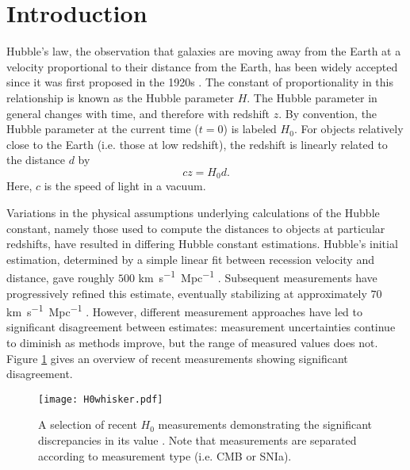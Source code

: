 \section{\label{sec:intro} Introduction}

Hubble's law, the observation that galaxies are moving away from the Earth at a velocity proportional to their distance from the Earth, has been widely accepted since it was first proposed in the 1920s \cite{Hubble_1929}.
The constant of proportionality in this relationship is known as the Hubble parameter $H$.
The Hubble parameter in general changes with time, and therefore with redshift $z$. By convention, the Hubble parameter at the current time ($t=0$) is labeled $H_0$.
For objects relatively close to the Earth (i.e. those at low redshift), the redshift is linearly related to the distance $d$ by \cite{Freedman_2010}
\begin{equation}
    c z = H_0 d.
\end{equation}
Here, $c$ is the speed of light in a vacuum.

Variations in the physical assumptions underlying calculations of the Hubble constant, namely those used to compute the distances to objects at particular redshifts, have resulted in differing Hubble constant estimations.
Hubble’s initial estimation, determined by a simple linear fit between recession velocity and distance, gave roughly $500$ \si{km.s^{-1}.Mpc^{-1}} \cite{Hubble_1929}.
Subsequent measurements have progressively refined this estimate, eventually stabilizing at approximately $70$ \si{km.s^{-1}.Mpc^{-1}} \cite{Freedman_2010}.
However, different measurement approaches have led to significant disagreement between estimates: measurement uncertainties continue to diminish as methods improve, but the range of measured values does not.
Figure \ref{fig:hist_h0} gives an overview of recent measurements showing significant disagreement.

\begin{figure}
    \centering
    \texttt{[image: H0whisker.pdf]}
    \caption{A selection of recent $H_0$ measurements demonstrating the significant discrepancies in its value \cite{Pogosian_2020, Planck_2020, Aiola_2020, WMAP_2018, Henning_2018, Planck_2016, Hinshaw_2013, Freedman_2001, Freedman_2012, Riess_2016, Feeney_2018, Burns_2018,  Riess_2019, Camarena_2020, Riess_2021, Breuval_2020}. Note that measurements are separated according to measurement type (i.e. CMB or SNIa). }
    \label{fig:hist_h0}
\end{figure}

